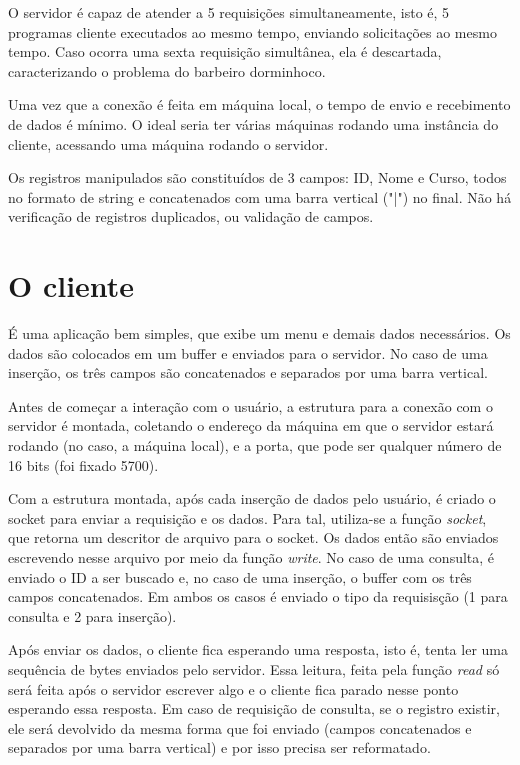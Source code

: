 \documentclass[12pt]{article}
\begin{document}
O servidor é capaz de atender a 5 requisições simultaneamente, isto é, 5 programas cliente executados ao mesmo tempo, enviando solicitações ao mesmo tempo. Caso ocorra uma sexta requisição simultânea, ela é descartada, caracterizando o problema do barbeiro dorminhoco.

Uma vez que a conexão é feita em máquina local, o tempo de envio e recebimento de dados é mínimo. O ideal seria ter várias máquinas rodando uma instância do cliente, acessando uma máquina rodando o servidor.

Os registros manipulados são constituídos de 3 campos: ID, Nome e Curso, todos no formato de string e concatenados com uma barra vertical ("|") no final. Não há verificação de registros duplicados, ou validação de campos.

\section{O cliente}

É uma aplicação bem simples, que exibe um menu e demais dados necessários. Os dados são colocados em um buffer e enviados para o servidor. No caso de uma inserção, os três campos são concatenados e separados por uma barra vertical.

Antes de começar a interação com o usuário, a estrutura para a conexão com o servidor é montada, coletando o endereço da máquina em que o servidor estará rodando (no caso, a máquina local), e a porta, que pode ser qualquer número de 16 bits (foi fixado 5700).

Com a estrutura montada, após cada inserção de dados pelo usuário, é criado o socket para enviar a requisição e os dados. Para tal, utiliza-se a função \emph{socket}, que retorna um descritor de arquivo para o socket. Os dados então são enviados escrevendo nesse arquivo por meio da função \emph{write}. No caso de uma consulta, é enviado o ID a ser buscado e, no caso de uma inserção, o buffer com os três campos concatenados. Em ambos os casos é enviado o tipo da requisisção (1 para consulta e 2 para inserção).

Após enviar os dados, o cliente fica esperando uma resposta, isto é, tenta ler uma sequência de bytes enviados pelo servidor. Essa leitura, feita pela função \emph{read} só será feita após o servidor escrever algo e o cliente fica parado nesse ponto esperando essa resposta. Em caso de requisição de consulta, se o registro existir, ele será devolvido da mesma forma que foi enviado (campos concatenados e separados por uma barra vertical) e por isso precisa ser reformatado.
\end{document}

